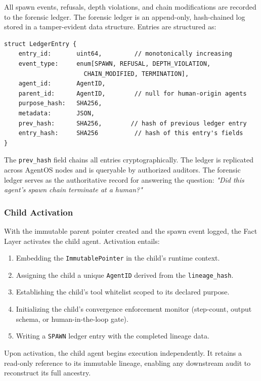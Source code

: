 All spawn events, refusals, depth violations, and chain modifications are recorded to the forensic ledger. The forensic ledger is an append-only, hash-chained log stored in a tamper-evident data structure. Entries are structured as:

\begin{verbatim}
struct LedgerEntry {
    entry_id:       uint64,         // monotonically increasing
    event_type:     enum[SPAWN, REFUSAL, DEPTH_VIOLATION, 
                      CHAIN_MODIFIED, TERMINATION],
    agent_id:       AgentID,
    parent_id:      AgentID,        // null for human-origin agents
    purpose_hash:   SHA256,
    metadata:       JSON,
    prev_hash:      SHA256,        // hash of previous ledger entry
    entry_hash:     SHA256          // hash of this entry's fields
}
\end{verbatim}

The \texttt{prev\_hash} field chains all entries cryptographically. The ledger is replicated across AgentOS nodes and is queryable by authorized auditors. The forensic ledger serves as the authoritative record for answering the question: \textit{"Did this agent's spawn chain terminate at a human?"}

\subsubsection{Child Activation}
\label{subsubsection:child-activation}

With the immutable parent pointer created and the spawn event logged, the Fact Layer activates the child agent. Activation entails:

\begin{enumerate}
    \item Embedding the \texttt{ImmutablePointer} in the child's runtime context.
    \item Assigning the child a unique \texttt{AgentID} derived from the \texttt{lineage\_hash}.
    \item Establishing the child's tool whitelist scoped to its declared purpose.
    \item Initializing the child's convergence enforcement monitor (step-count, output schema, or human-in-the-loop gate).
    \item Writing a \texttt{SPAWN} ledger entry with the completed lineage data.
\end{enumerate}

Upon activation, the child agent begins execution independently. It retains a read-only reference to its immutable lineage, enabling any downstream audit to reconstruct its full ancestry.

